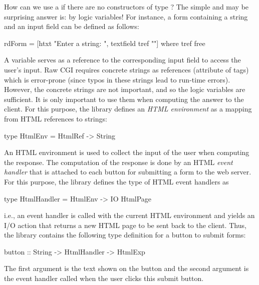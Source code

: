 How can we use a  if there are no constructors
of type ?
The simple and may be surprising answer is: by logic variables!
For instance, a form containing a string
and an input field can be defined as follows:
%
\begin{curry}
rdForm = [htxt "Enter a string: ", textfield tref ""]
 where tref free
\end{curry} %
%
A  variable serves as a reference to the corresponding
input field to access the user's input. Raw CGI requires concrete
strings as references (attribute  of  tags)
which is error-prone (since typos in these strings lead to
run-time errors).
However, the concrete strings are not important, and so the
logic variables are sufficient. It is only important
to use them when computing the answer to the client.
For this purpose, the library  defines
an \emph{HTML environment} as a mapping
from HTML references to strings:
%
\begin{curry}
type HtmlEnv = HtmlRef -> String
\end{curry}
%
An HTML environment is used to collect the input of the user
when computing the response. The computation of the response is done
by an HTML \emph{event handler}
that is attached to each button for submitting a form to the web server.
For this purpose, the library 
defines the type of HTML event handlers as
%
\begin{curry}
type HtmlHandler = HtmlEnv -> IO HtmlPage
\end{curry}
%
i.e., an event handler is called with the current HTML environment and
yields an I/O action that returns a new HTML page to be sent back to the client.
Thus, the library  contains the following type definition
for a button to submit forms:
%
\begin{curry}
button :: String -> HtmlHandler -> HtmlExp
\end{curry}
%
The first argument is the text shown on the button
and the second argument is the event handler called when the user
clicks this submit button.

